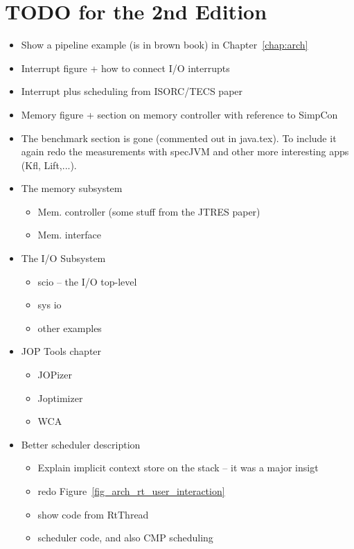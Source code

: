 \chapter{TODO for the 2nd Edition}

\begin{itemize}
  \item Show a pipeline example (is in brown book) in
      Chapter~\ref{chap:arch}
  \item Interrupt figure + how to connect I/O interrupts
  \item Interrupt plus scheduling from ISORC/TECS paper
  \item Memory figure + section on memory controller with
      reference to SimpCon
  \item The benchmark section is gone (commented out in
      java.tex). To include it again redo the measurements with
      specJVM and other more interesting apps (Kfl, Lift,...).
  \item The memory subsystem
  \begin{itemize}
    \item Mem. controller (some stuff from the JTRES paper)
    \item Mem. interface
  \end{itemize}
  \item The I/O Subsystem
  \begin{itemize}
    \item scio -- the I/O top-level
    \item sys io
    \item other examples
  \end{itemize}
  \item JOP Tools chapter
  \begin{itemize}
    \item JOPizer
    \item Joptimizer
    \item WCA
  \end{itemize}
  \item Better scheduler description
\begin{itemize}
  \item Explain implicit context store on the stack -- it was
      a major insigt
  \item redo Figure~\ref{fig_arch_rt_user_interaction}
  \item show code from RtThread
  \item scheduler code, and also CMP scheduling
\end{itemize}

\end{itemize}
